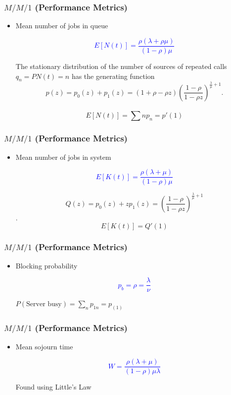 \documentclass{beamer}
\def \mp {\pause}
\def \mp {}
\newcommand{\ft}[1]{\frametitle{#1}}
\newcommand{\tcb}[1]{\textcolor{blue}{#1}}
\begin{document}
\begin{frame}
 \ft{$M/M/1$ (Performance Metrics)}

\begin{itemize}\setlength\itemsep{.6em}
 \mp \item Mean number of jobs in queue
 \mp
\begin{tcolorbox}
\tcb{\[E[N(t)] = \frac{\rho(\lambda + \rho\mu)}{(1-\rho)\mu}\]} 
\end{tcolorbox}
The stationary distribution of the number of sources of repeated calls  $q_{n}=P{N(t)=n}$ has the generating function
\[p(z)=p_{0}(z)+p_{1}(z)=(1+\rho-\rho z)(\frac{1-\rho}{1-\rho z})^{\frac{\lambda}{\mu}+1}.\] \\ 
\[E[N(t)]=\sum np_n= p'(1)\]
\end{itemize}
\end{frame}

\begin{frame}
 \ft{$M/M/1$ (Performance Metrics)}

\begin{itemize}\setlength\itemsep{.6em}
 \mp \item Mean number of jobs in system
 \mp
\begin{tcolorbox}
\tcb{\[E[K(t)] = \frac{\rho(\lambda + \mu)}{(1-\rho)\mu}\]} 
\end{tcolorbox}
$$Q(z)=p_{0}(z)+zp_{1}(z)=(\frac{1-\rho}{1-\rho z})^{\frac{\lambda}{\mu}+1}$$.
$$E[K(t)]=Q'(1)$$
\end{itemize}
\end{frame}

\begin{frame}
 \ft{$M/M/1$ (Performance Metrics)}

\begin{itemize}\setlength\itemsep{.6em}
 \mp \item  Blocking probability
 \mp
\begin{tcolorbox}
\tcb{\[p_b = \rho = \frac{\lambda}{\nu}\]} 
\end{tcolorbox}
$P(\text{Server busy})=\sum_{n} p_{1n}= p_(1)$
\end{itemize}
\end{frame}

\begin{frame}
 \ft{$M/M/1$ (Performance Metrics)}

\begin{itemize}\setlength\itemsep{.6em}
 \mp \item  Mean sojourn time
 \mp
\begin{tcolorbox}
\tcb{\[W = \frac{\rho(\lambda + \mu)}{(1-\rho)\mu\lambda}\]} 
\end{tcolorbox}
Found using Little's Law
\end{itemize}
\end{frame}
\end{document}
